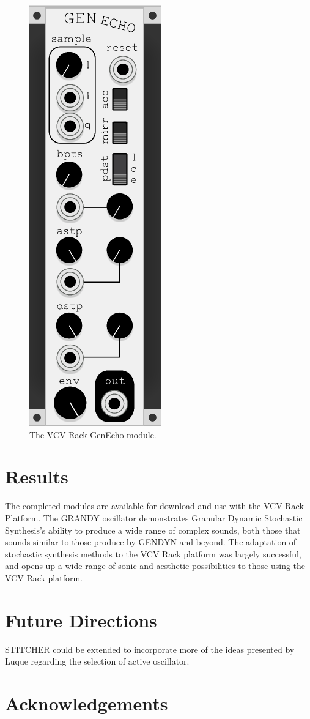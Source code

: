 \documentclass[10pt]{article}
\begin{document}
\begin{figure}
  \caption{The VCV Rack GenEcho module.}
  \centering
    \includegraphics[height=0.25\textheight]{genecho}
\end{figure}

\section{Results}
The completed modules are available for download and use with the VCV Rack Platform. The GRANDY oscillator demonstrates Granular Dynamic Stochastic Synthesis's ability to produce a wide range of complex sounds, both those that sounds similar to those produce by GENDYN and beyond. The adaptation of stochastic synthesis methods to the VCV Rack platform was largely successful, and opens up a wide range of sonic and aesthetic possibilities to those using the VCV Rack platform. 

\section{Future Directions}
STITCHER could be extended to incorporate more of the ideas presented by Luque regarding the selection of active oscillator.


\section{Acknowledgements}

\pagebreak


\end{document}
